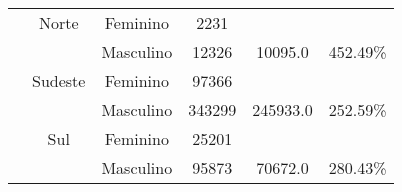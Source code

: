 \begin{table}[htbp]
\begin{center}
\begin{tabular}{|c|c|c|c|c|c|}
			             & Norte            & Feminino      & 2231           &              &                \\
			             &                  & Masculino     & 12326          & 10095.0      & 452.49\%       \\
			             & Sudeste          & Feminino      & 97366          &              &                \\
			             &                  & Masculino     & 343299         & 245933.0     & 252.59\%       \\
			             & Sul              & Feminino      & 25201          &              &                \\
			             &                  & Masculino     & 95873          & 70672.0      & 280.43\%       \\
			\hline
		\end{tabular}
		\label{desligTotal}
	\end{center}
\end{table}